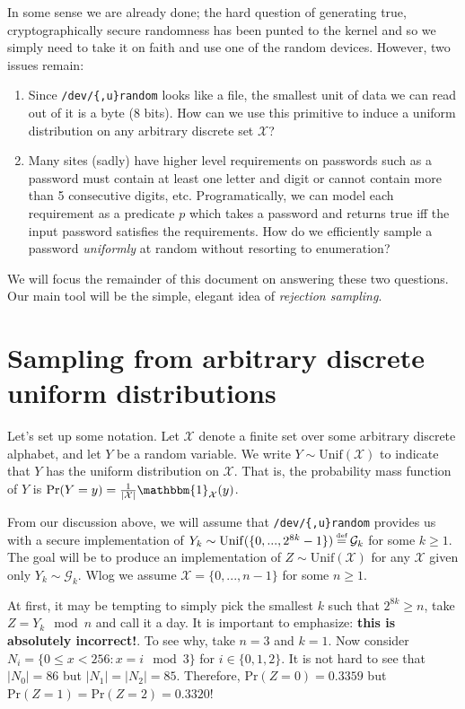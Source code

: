 \documentclass[10pt]{article}
\newcommand{\X}{\mathcal{X}}
\newcommand{\G}{\mathcal{G}}
\newcommand{\ind}{\mathbbm{1}}
\newcommand{\abs}[1]{\left| #1 \right|}
\newcommand{\Unif}{\mathrm{Unif}}
\renewcommand{\Pr}{\mathrm{Pr}}
\newcommand\defeq{\stackrel{\mathclap{\normalfont\tiny\mbox{def}}}{=}}
\begin{document}
In some sense we are already done; the hard question of generating true,
cryptographically secure randomness has been punted to the kernel and so we
simply need to take it on faith and use one of the random devices. However, two
issues remain:
\begin{enumerate}
  \item Since \verb|/dev/{,u}random| looks like a file, the smallest unit of data
    we can read out of it is a byte (8 bits). How can we use this primitive to induce
    a uniform distribution on any arbitrary discrete set $\X$?
  \item Many sites (sadly) have higher level requirements on passwords such as 
    a password must contain at least one letter and digit or cannot contain
    more than 5 consecutive digits, etc. Programatically, we can model each
    requirement as a predicate $p$ which takes a password and returns true iff
    the input password satisfies the requirements. How do we efficiently sample
    a password \emph{uniformly} at random without resorting to enumeration?
\end{enumerate}
We will focus the remainder of this document on answering these two questions.
Our main tool will be the simple, elegant idea of \emph{rejection sampling}. 

\section{Sampling from arbitrary discrete uniform distributions}
Let's set up some notation. Let $\X$ denote a finite set over some arbitrary
discrete alphabet, and let $Y$ be a random variable. We write $Y \sim
\Unif(\X)$ to indicate that $Y$ has the uniform distribution on $\X$.  That is,
the probability mass function of $Y$ is $\Pr(Y=y) = \frac{1}{\abs{\X}}
\ind_{\X}(y)$.

From our discussion above, we will assume that \verb|/dev/{,u}random| provides
us with a secure implementation of $Y_k \sim \Unif(\{0, ..., 2^{8k} - 1\}) \defeq \G_k$ for some $k \geq 1$.
%
The goal will be to produce an implementation of $Z \sim \Unif(\X)$ for any
$\X$ given only $Y_k \sim \G_k$. Wlog we assume $\X = \{0, ..., n-1\}$ for some $n
\geq 1$.

At first, it may be tempting to simply pick the smallest $k$ such that $2^{8k}
\geq n$, take $Z = Y_k \mod{n}$ and call it a day. It is
important to emphasize: \textbf{this is absolutely incorrect!}.
%
To see why, take $n=3$ and $k=1$. Now consider $N_i = \{ 0 \leq x < 256 : x = i \mod{3}
\}$ for $i \in \{0,1,2\}$. It is not hard to see that $\abs{N_0} = 86$ but
$\abs{N_1}=\abs{N_2} = 85$. Therefore, $\Pr(Z=0) = 0.3359$ but
$\Pr(Z=1)=\Pr(Z=2)=0.3320$!
\end{document}
